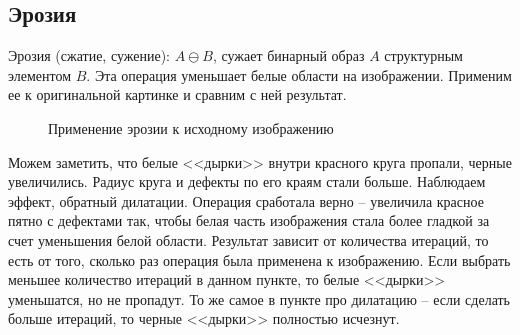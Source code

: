 \documentclass[a4paper, 12pt]{article}
\begin{document}
    \subsection{Эрозия}
    Эрозия (сжатие, сужение): $A\ominus B$, сужает бинарный образ $A$ структурным элементом $B$. Эта операция уменьшает
    белые области на изображении. Применим ее к оригинальной картинке и сравним с ней результат.
    \begin{figure}[H]
        \centering
        \captionsetup{skip=0pt}
        \caption{Применение эрозии к исходному изображению}
        \label{fig:er1}
    \end{figure}
    Можем заметить, что белые <<дырки>> внутри красного круга пропали, черные увеличились. Радиус круга и дефекты по его краям
    стали больше. Наблюдаем эффект, обратный дилатации. Операция сработала верно -- увеличила красное пятно с дефектами так, чтобы
    белая часть изображения стала более гладкой за счет уменьшения белой области. Результат зависит от количества итераций, то есть от того, сколько раз
    операция была применена к изображению. Если выбрать меньшее количество итераций в данном пункте, то белые <<дырки>> уменьшатся,
    но не пропадут. То же самое в пункте про дилатацию -- если сделать больше итераций, то черные <<дырки>> полностью исчезнут.
\end{document}
